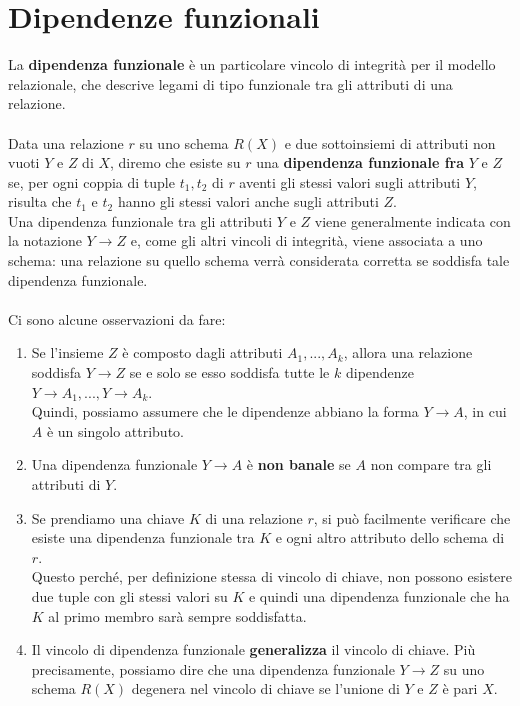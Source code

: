 \section{Dipendenze funzionali}
La \textbf{dipendenza funzionale} è un particolare vincolo di integrità per il modello relazionale, che descrive legami di tipo funzionale tra gli attributi di una relazione.\\\\
Data una relazione $r$ su uno schema $R(X)$ e due sottoinsiemi di attributi non vuoti $Y$ e $Z$ di $X$, diremo che esiste su $r$ una \textbf{dipendenza funzionale fra} $Y$ e $Z$ se, per ogni coppia di tuple $t_1, t_2$ di $r$ aventi gli stessi valori sugli attributi $Y$, risulta che $t_1$ e $t_2$ hanno gli stessi valori anche sugli attributi $Z$.\\
Una dipendenza funzionale tra gli attributi $Y$ e $Z$ viene generalmente indicata con la notazione $Y \rightarrow Z$ e, come gli altri vincoli di integrità, viene associata a uno schema: una relazione su quello schema verrà considerata corretta se soddisfa tale dipendenza funzionale.\\\\
Ci sono alcune osservazioni da fare:
    \begin{enumerate}
        \item{Se l'insieme $Z$ è composto dagli attributi $A_1, ..., A_k$, allora una relazione soddisfa $Y \rightarrow Z$ se e solo se esso soddisfa tutte le $k$ dipendenze $Y \rightarrow A_1, ..., Y \rightarrow A_k$.\\
        Quindi, possiamo assumere che le dipendenze abbiano la forma $Y \rightarrow A$, in cui $A$ è un singolo attributo.}
        \item{Una dipendenza funzionale $Y \rightarrow A$ è \textbf{non banale} se $A$ non compare tra gli attributi di $Y$.}
        \item{Se prendiamo una chiave $K$ di una relazione $r$, si può facilmente verificare che esiste una dipendenza funzionale tra $K$ e ogni altro attributo dello schema di $r$.\\
        Questo perché, per definizione stessa di vincolo di chiave, non possono esistere due tuple con gli stessi valori su $K$ e quindi una dipendenza funzionale che ha $K$ al primo membro sarà sempre soddisfatta.}
        \item{Il vincolo di dipendenza funzionale \textbf{generalizza} il vincolo di chiave. Più precisamente, possiamo dire che una dipendenza funzionale $Y \rightarrow Z$ su uno schema $R(X)$ degenera nel vincolo di chiave se l'unione di $Y$ e $Z$ è pari $X$.}
    \end{enumerate}

